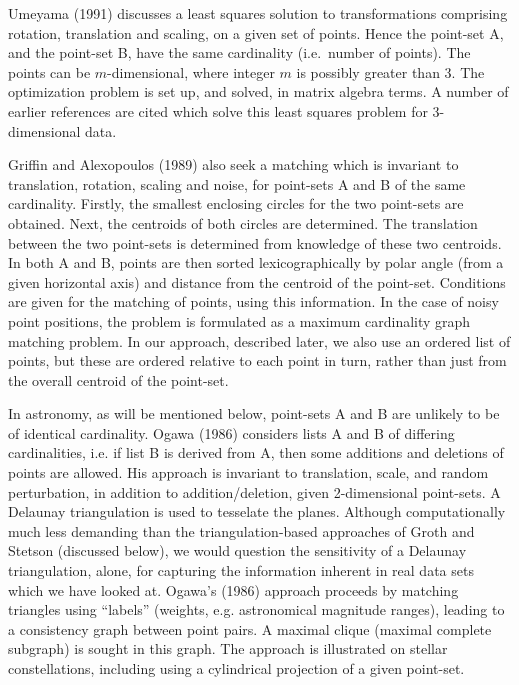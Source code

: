 Umeyama (1991) discusses a least squares solution to transformations
comprising rotation, translation and scaling, on a given set of points.
Hence the point-set A, and the point-set B, have the same cardinality
(i.e.\ number of points).
The points can be $m$-dimensional, where integer $m$ is possibly greater 
than 3.  The optimization problem is set up,
and solved, in matrix algebra terms.  A number of earlier references 
are cited which solve this least squares problem for 3-dimensional data.

Griffin and Alexopoulos (1989) also seek a matching which is invariant
to translation, rotation, scaling and noise, for point-sets A and B of the
same cardinality.  Firstly, the smallest enclosing
circles for the two point-sets are obtained.  Next, the centroids of both
circles are determined.  The translation between the two point-sets is
determined from knowledge of these two centroids.  In both A and B,
points are then sorted lexicographically by polar angle (from a given 
horizontal axis) and distance from the centroid of the point-set.  
Conditions are given
for the matching of points, using this information.  In the case of noisy
point positions, the problem is formulated as a maximum cardinality graph
matching problem.  In our approach, described later, we also use an 
ordered list of points, but these are ordered relative to each point in
turn, rather than just from the overall centroid of the point-set.

In astronomy, as will be mentioned below, point-sets A and B are unlikely
to be of identical cardinality.
Ogawa (1986) considers lists A and B of differing cardinalities, i.e. if list
B is derived from A, then some additions and deletions of points are
allowed.  His approach is invariant to translation, scale, and random
perturbation, in addition to addition/deletion, given 2-dimensional 
point-sets. A Delaunay triangulation is used to tesselate the planes.  Although
computationally much less demanding than the triangulation-based approaches
of Groth and Stetson (discussed below), we would question the sensitivity 
of a Delaunay triangulation, alone, for capturing the information inherent
in real data sets which we have looked at.  Ogawa's (1986) approach proceeds
by matching triangles using ``labels'' (weights, e.g. 
astronomical magnitude ranges), 
leading to a consistency graph between point pairs.
A maximal clique (maximal complete subgraph) is sought in this graph.
The approach is illustrated on stellar constellations, including using a 
cylindrical projection of a given point-set.

